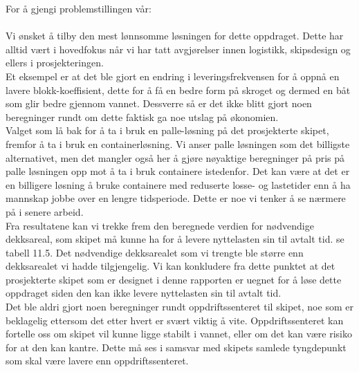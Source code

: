 \documentclass[norsk]{article}
\begin{document}
For å gjengi problemstillingen vår: \\

\noindent{}\\

Vi ønsket å tilby den mest lønnsomme løsningen for dette oppdraget. Dette har alltid vært i hovedfokus når vi har tatt avgjørelser innen logistikk, skipsdesign og ellers i prosjekteringen.\\

Et eksempel er at det ble gjort en endring i leveringsfrekvensen for å oppnå en lavere blokk-koeffisient, dette for å få en bedre form på skroget og dermed en båt som glir bedre gjennom vannet. Dessverre så er det ikke blitt gjort noen beregninger rundt om dette faktisk ga noe utslag på økonomien. \\

Valget som lå bak for å ta i bruk en palle-løsning på det prosjekterte skipet, fremfor å ta i bruk en containerløsning. Vi anser palle løsningen som det billigste alternativet, men det mangler også her å gjøre nøyaktige beregninger på pris på palle løsningen opp mot å ta i bruk containere istedenfor. Det kan være at det er en billigere løsning å bruke containere med reduserte losse- og lastetider enn å ha mannskap jobbe over en lengre tidsperiode. Dette er noe vi tenker å se nærmere på i senere arbeid.\\

Fra resultatene kan vi trekke frem den beregnede verdien for nødvendige dekksareal, som skipet må kunne ha for å levere nyttelasten sin til avtalt tid. se tabell 11.5. Det nødvendige dekksarealet som vi trengte ble større enn dekksarealet vi hadde tilgjengelig. Vi kan konkludere fra dette punktet at det prosjekterte skipet som er designet i denne rapporten er uegnet for å løse dette oppdraget siden den kan ikke levere nyttelasten sin til avtalt tid.\\

Det ble aldri gjort noen beregninger rundt oppdriftssenteret til skipet, noe som er beklagelig ettersom det etter hvert er svært viktig å vite. Oppdriftssenteret kan fortelle oss om skipet vil kunne ligge stabilt i vannet, eller om det kan være risiko for at den kan kantre. Dette må ses i samsvar med skipets samlede tyngdepunkt som skal være lavere enn oppdriftssenteret. \\
\end{document}
